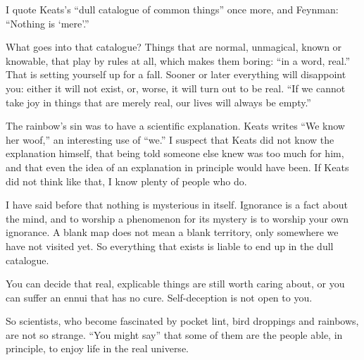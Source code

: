 
I quote Keats's ``dull catalogue of common things'' once more, and Feynman: ``Nothing is `mere'.''

What goes into that catalogue? Things that are normal, unmagical, known or knowable, that play by rules at all, which makes them boring: ``in a word, real.'' That is setting yourself up for a fall. Sooner or later everything will disappoint you: either it will not exist, or, worse, it will turn out to be real. ``If we cannot take joy in things that are merely real, our lives will always be empty.''

The rainbow's sin was to have a scientific explanation. Keats writes ``We know her woof,'' an interesting use of ``we.'' I suspect that Keats did not know the explanation himself, that being told someone else knew was too much for him, and that even the idea of an explanation in principle would have been.  If Keats did not think like that, I know plenty of people who do.

I have said before that nothing is mysterious in itself. Ignorance is a fact about the mind, and to worship a phenomenon for its mystery is to worship your own ignorance. A blank map does not mean a blank territory, only somewhere we have not visited yet. So everything that exists is liable to end up in the dull catalogue.

You can decide that real, explicable things are still worth caring about, or you can suffer an ennui that has no cure. Self-deception is not open to you.

So scientists, who become fascinated by pocket lint, bird droppings and rainbows, are not so strange. ``You might say'' that some of them are the people able, in principle, to enjoy life in the real universe.
